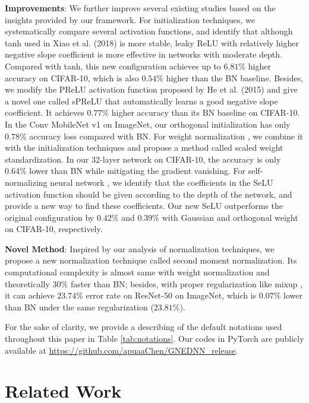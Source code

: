 \documentclass[10pt,journal,compsoc]{IEEEtran}
\newcommand{\modify}[1]{{ #1}}
\begin{document}
\textbf{Improvements}: We further improve several existing studies based on the insights provided by our framework. For initialization techniques, we systematically compare several activation functions, and identify that although tanh used in Xiao et al. (2018) \cite{xiao2018dynamical} is more stable, leaky ReLU with relatively higher negative slope coefficient is more effective in networks with moderate depth. Compared with tanh, this new configuration achieves up to $6.81\%$ higher accuracy on CIFAR-10, which is also $0.54\%$ higher than the BN baseline. Besides, we modify the PReLU activation function proposed by He et al. (2015) \cite{he2015delving} and give a novel one called sPReLU that automatically learns a good negative slope coefficient. It achieves $0.77\%$ higher accuracy than its BN baseline on CIFAR-10. In the Conv MobileNet v1 on ImageNet, \modify{our orthogonal initialization has only $0.78\%$ accuracy loss compared with BN}. For weight normalization \cite{salimans2016weight}, we combine it with the initialization techniques and propose a method called scaled weight standardization. In our 32-layer network on CIFAR-10, the accuracy is only $0.64\%$ lower than BN while mitigating the gradient vanishing. For self-normalizing neural network \cite{klambauer2017self}, we identify that the coefficients in the SeLU activation function should be given according to the depth of the network, and provide a new way to find these coefficients. Our new SeLU outperforms the original configuration by $0.42\%$ and $0.39\%$ with Gaussian and orthogonal weight on CIFAR-10, respectively.

\textbf{Novel Method}: Inspired by our analysis of normalization techniques, we propose a new normalization technique called second moment normalization. \modify{Its computational complexity is almost same with weight normalization \cite{salimans2016weight} and theoretically $30\%$ faster than BN; besides, with proper regularization like mixup \cite{zhang2017mixup}, it can achieve $23.74\%$ error rate on ResNet-50 on ImageNet, which is $0.07\%$ lower than BN under the same regularization ($23.81\%$).}

For the sake of clarity, we provide a describing of the default notations used throughout this paper in Table \ref{tab:notations}. Our codes in PyTorch are publicly available at \href{https://github.com/apuaaChen/GNEDNN\_release}{https://github.com/apuaaChen/GNEDNN\_release}.
 
\section{Related Work}\label{sec:related_works}
\end{document}
